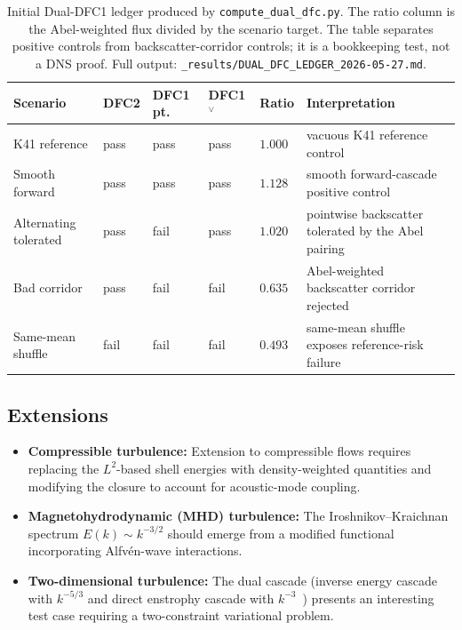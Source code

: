 \documentclass[12pt,a4paper]{article}
\theoremstyle{breakdef}
\theoremstyle{breakplain}
\theoremstyle{breakdef}
\begin{document}
\begin{table}[htbp]
\centering
\footnotesize
\setlength{\tabcolsep}{3.5pt}
\renewcommand{\arraystretch}{1.15}
\begin{tabularx}{\textwidth}{>{\raggedright\arraybackslash}p{2.6cm} >{\centering\arraybackslash}p{1.0cm} >{\centering\arraybackslash}p{1.05cm} >{\centering\arraybackslash}p{1.25cm} >{\centering\arraybackslash}p{1.15cm} Y}
\toprule
Scenario & DFC2 & DFC1 pt. & DFC1$^\vee$ & Ratio & Interpretation \\
\midrule
K41 reference & pass & pass & pass & $1.000$ & vacuous K41 reference control \\
\addlinespace[2pt]
Smooth forward & pass & pass & pass & $1.128$ & smooth forward-cascade positive control \\
\addlinespace[2pt]
Alternating tolerated & pass & fail & pass & $1.020$ & pointwise backscatter tolerated by the Abel pairing \\
\addlinespace[2pt]
Bad corridor & pass & fail & fail & $0.635$ & Abel-weighted backscatter corridor rejected \\
\addlinespace[2pt]
Same-mean shuffle & fail & fail & fail & $0.493$ & same-mean shuffle exposes reference-risk failure \\
\bottomrule
\end{tabularx}
\caption{Initial Dual-DFC1 ledger produced by \texttt{compute\_dual\_dfc.py}. The ratio column is the Abel-weighted flux divided by the scenario target. The table separates positive controls from backscatter-corridor controls; it is a bookkeeping test, not a DNS proof. Full output: \texttt{\_results/DUAL\_DFC\_LEDGER\_2026-05-27.md}.}
\label{tab:dual-dfc-ledger}
\end{table}

\subsection{Extensions}

\begin{itemize}
  \item \textbf{Compressible turbulence:}
    Extension to compressible flows requires replacing the $L^2$-based
    shell energies with density-weighted quantities and modifying the
    closure to account for acoustic-mode coupling.
  \item \textbf{Magnetohydrodynamic (MHD) turbulence:}
    The Iroshnikov--Kraichnan spectrum $E(k) \sim k^{-3/2}$ should emerge
    from a modified functional incorporating Alfvén-wave interactions.
  \item \textbf{Two-dimensional turbulence:}
    The dual cascade (inverse energy cascade with $k^{-5/3}$ and direct
    enstrophy cascade with $k^{-3}$~\cite{Kraichnan67}) presents an
    interesting test case requiring a two-constraint variational problem.
\end{itemize}
\end{document}
